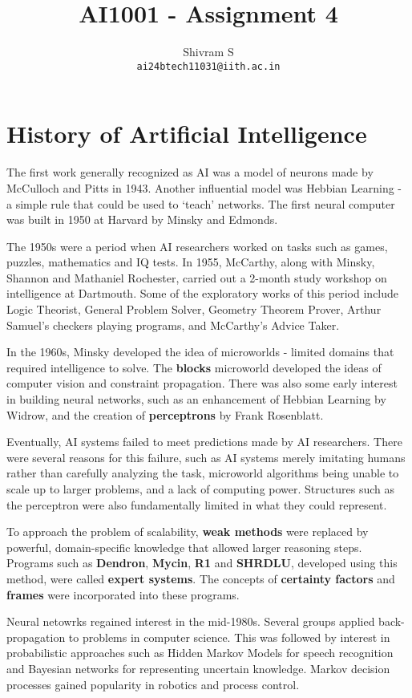 \documentclass{article}
\author{Shivram S \\ \texttt{ai24btech11031@iith.ac.in}}
\title{AI1001 - Assignment 4}
\begin{document}
\maketitle

\section{History of Artificial Intelligence}

The first work generally recognized as AI was a model of neurons made by
McCulloch and Pitts in 1943. Another influential model was Hebbian Learning
- a simple rule that could be used to `teach' networks. The first neural
computer was built in 1950 at Harvard by Minsky and Edmonds.

The 1950s were a period when AI researchers worked on tasks such as games,
puzzles, mathematics and IQ tests. In 1955, McCarthy, along with Minsky,
Shannon and Mathaniel Rochester, carried out a 2-month study workshop on
intelligence at Dartmouth. Some of the exploratory works of this period
include Logic Theorist, General Problem Solver, Geometry Theorem Prover,
Arthur Samuel's checkers playing programs, and McCarthy's Advice Taker.

In the 1960s, Minsky developed the idea of microworlds - limited domains that required
intelligence to solve. The \textbf{blocks} microworld developed the ideas of
computer vision and constraint propagation. There was also some early
interest in building neural networks, such as an enhancement of Hebbian Learning
by Widrow, and the creation of \textbf{perceptrons} by Frank Rosenblatt. 

Eventually, AI systems failed to meet predictions made by AI researchers.
There were several reasons for this failure, such as AI systems merely
imitating humans rather than carefully analyzing the task, microworld
algorithms being unable to scale up to larger problems, and a lack of 
computing power. Structures such as the perceptron were also fundamentally
limited in what they could represent. 

To approach the problem of scalability, \textbf{weak methods} were replaced
by powerful, domain-specific knowledge that allowed larger reasoning steps.
Programs such as \textbf{Dendron}, \textbf{Mycin}, \textbf{R1} and \textbf{SHRDLU}, developed using this method,
were called \textbf{expert systems}. The concepts of \textbf{certainty factors} and \textbf{frames}
were incorporated into these programs.

Neural netowrks regained interest in the mid-1980s. Several
groups applied back-propagation to problems in computer science.
This was followed by interest in probabilistic approaches such
as Hidden Markov Models for speech recognition and Bayesian
networks for representing uncertain knowledge. Markov decision
processes gained popularity in robotics and process control.
\end{document}
